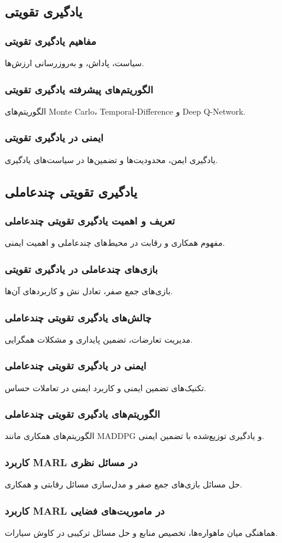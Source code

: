 \subsection{یادگیری تقویتی}
\subsubsection{مفاهیم یادگیری تقویتی}
سیاست، پاداش، و به‌روزرسانی ارزش‌ها.
\subsubsection{الگوریتم‌های پیشرفته یادگیری تقویتی}
الگوریتم‌های Monte Carlo، Temporal-Difference و Deep Q-Network.
\subsubsection{ایمنی در یادگیری تقویتی}
یادگیری ایمن، محدودیت‌ها و تضمین‌ها در سیاست‌های یادگیری.

\subsection{یادگیری تقویتی چندعاملی}
\subsubsection{تعریف و اهمیت یادگیری تقویتی چندعاملی}
مفهوم همکاری و رقابت در محیط‌های چندعاملی و اهمیت ایمنی.
\subsubsection{بازی‌های چندعاملی در یادگیری تقویتی}
بازی‌های جمع صفر، تعادل نش و کاربردهای آن‌ها.
\subsubsection{چالش‌های یادگیری تقویتی چندعاملی}
مدیریت تعارضات، تضمین پایداری و مشکلات همگرایی.
\subsubsection{ایمنی در یادگیری تقویتی چندعاملی}
تکنیک‌های تضمین ایمنی و کاربرد ایمنی در تعاملات حساس.
\subsubsection{الگوریتم‌های یادگیری تقویتی چندعاملی}
الگوریتم‌های همکاری مانند MADDPG و یادگیری توزیع‌شده با تضمین ایمنی.
\subsubsection{کاربرد MARL در مسائل نظری}
حل مسائل بازی‌های جمع صفر و مدل‌سازی مسائل رقابتی و همکاری.
\subsubsection{کاربرد MARL در ماموریت‌های فضایی}
هماهنگی میان ماهواره‌ها، تخصیص منابع و حل مسائل ترکیبی در کاوش سیارات.

